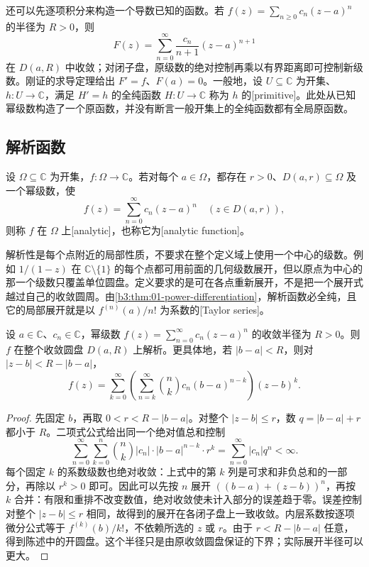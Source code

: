 \ProseParagraphBreak

还可以先逐项积分来构造一个导数已知的函数。若 \(f(z)=\sum_{n\ge0}c_n(z-a)^n\) 的半径为 \(R>0\)，则
\[
 F(z)=\sum_{n=0}^{\infty}\frac{c_n}{n+1}(z-a)^{n+1}
\]
在 \(D(a,R)\) 中收敛；对闭子盘，原级数的绝对控制再乘以有界距离即可控制新级数。刚证的求导定理给出 \(F'=f\)、\(F(a)=0\)。一般地，设 \(U\subseteq\mathbb C\) 为开集、\(h:U\to\mathbb C\)，满足 \(H'=h\) 的全纯函数 \(H:U\to\mathbb C\) 称为 \(h\) 的[primitive]。此处从已知幂级数构造了一个原函数，并没有断言一般开集上的全纯函数都有全局原函数。

\subsection{解析函数}
\label{b3:subsec:010203}

\begin{definition}\label{b3:def:01-analytic}
设 \(\Omega\subseteq\mathbb C\) 为开集，\(f:\Omega\to\mathbb C\)。若对每个 \(a\in\Omega\)，都存在 \(r>0\)、\(D(a,r)\subseteq\Omega\) 及一个幂级数，使
\[
f(z)=\sum_{n=0}^\infty c_n(z-a)^n\quad(z\in D(a,r)),
\]
则称 \(f\) 在 \(\Omega\) 上[analytic]，也称它为[analytic function]。
\end{definition}

解析性是每个点附近的局部性质，不要求在整个定义域上使用一个中心的级数。例如 \(1/(1-z)\) 在 \(\mathbb C\setminus\{1\}\) 的每个点都可用前面的几何级数展开，但以原点为中心的那一个级数只覆盖单位圆盘。定义要求的是可在各点重新展开，不是把一个展开式越过自己的收敛圆周。由\cref{b3:thm:01-power-differentiation}，解析函数必全纯，且它的局部展开就是以 \(f^{(n)}(a)/n!\) 为系数的[Taylor series]。

\begin{proposition}\label{b3:prop:01-power-recenter}
设 \(a\in\mathbb C\)、\(c_n\in\mathbb C\)，幂级数 \(f(z)=\sum_{n=0}^{\infty}c_n(z-a)^n\) 的收敛半径为 \(R>0\)。则 \(f\) 在整个收敛圆盘 \(D(a,R)\) 上解析。更具体地，若 \(|b-a|<R\)，则对 \(|z-b|<R-|b-a|\)，
\[
f(z)=\sum_{k=0}^\infty\left(
\sum_{n=k}^\infty\binom nk c_n(b-a)^{n-k}\right)(z-b)^k.
\]
\end{proposition}
\begin{proof}
先固定 \(b\)，再取 \(0<r<R-|b-a|\)。对整个 \(|z-b|\le r\)，数 \(q=|b-a|+r\) 都小于 \(R\)。二项式公式给出同一个绝对值总和控制
\[
\sum_{n=0}^\infty\sum_{k=0}^n
\binom nk |c_n|\cdot|b-a|^{n-k}\cdot r^k
=\sum_{n=0}^\infty|c_n|q^n<\infty.
\]
每个固定 \(k\) 的系数级数也绝对收敛：上式中的第 \(k\) 列是可求和非负总和的一部分，再除以 \(r^k>0\) 即可。因此可以先按 \(n\) 展开 \(((b-a)+(z-b))^n\)，再按 \(k\) 合并：有限和重排不改变数值，绝对收敛使未计入部分的误差趋于零。误差控制对整个 \(|z-b|\le r\) 相同，故得到的展开在各闭子盘上一致收敛。内层系数按逐项微分公式等于 \(f^{(k)}(b)/k!\)，不依赖所选的 \(z\) 或 \(r\)。由于 \(r<R-|b-a|\) 任意，得到陈述中的开圆盘。这个半径只是由原收敛圆盘保证的下界；实际展开半径可以更大。
\end{proof}

